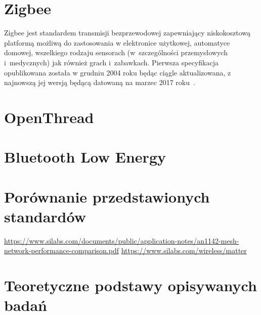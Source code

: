 \section{Zigbee}

Zigbee jest standardem transmisji bezprzewodowej zapewniający niskokosztową platformą
możliwą do zastosowania w elektronice użytkowej, automatyce domowej, wszelkiego rodzaju sensorach
(w~szczególności przemysłowych i~medycznych) jak również grach i~zabawkach.
Pierwsza specyfikacja opublikowana została w grudniu 2004 roku będąc ciągle aktualizowana,
z najnowszą jej wersją będącą datowaną na marzec 2017 roku~\cite{zigbee_alliance_zigbee_2017}.

\lipsum[1-9]
\section{OpenThread}
\lipsum[1-10]

\section{Bluetooth Low Energy}
\lipsum[1-10]

\section{Porównanie przedstawionych standardów} %
\url{https://www.silabs.com/documents/public/application-notes/an1142-mesh-network-performance-comparison.pdf}
\url{https://www.silabs.com/wireless/matter}
\lipsum[1-15]



\section{Teoretyczne podstawy opisywanych badań}

